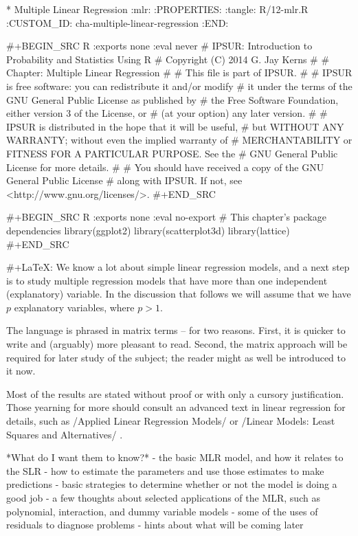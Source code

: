 * Multiple Linear Regression 						:mlr:
:PROPERTIES:
:tangle: R/12-mlr.R
:CUSTOM_ID: cha-multiple-linear-regression
:END:

#+BEGIN_SRC R :exports none :eval never
#    IPSUR: Introduction to Probability and Statistics Using R
#    Copyright (C) 2014  G. Jay Kerns
#
#    Chapter: Multiple Linear Regression
#
#    This file is part of IPSUR.
#
#    IPSUR is free software: you can redistribute it and/or modify
#    it under the terms of the GNU General Public License as published by
#    the Free Software Foundation, either version 3 of the License, or
#    (at your option) any later version.
#
#    IPSUR is distributed in the hope that it will be useful,
#    but WITHOUT ANY WARRANTY; without even the implied warranty of
#    MERCHANTABILITY or FITNESS FOR A PARTICULAR PURPOSE.  See the
#    GNU General Public License for more details.
#
#    You should have received a copy of the GNU General Public License
#    along with IPSUR.  If not, see <http://www.gnu.org/licenses/>.
#+END_SRC

#+BEGIN_SRC R :exports none :eval no-export
# This chapter's package dependencies
library(ggplot2)
library(scatterplot3d)
library(lattice)
#+END_SRC

#+LaTeX: \noindent 
We know a lot about simple linear regression models, and a next step
is to study multiple regression models that have more than one
independent (explanatory) variable. In the discussion that follows we
will assume that we have \(p\) explanatory variables, where \(p > 1\).

The language is phrased in matrix terms -- for two reasons. First, it
is quicker to write and (arguably) more pleasant to read. Second, the
matrix approach will be required for later study of the subject; the
reader might as well be introduced to it now.

Most of the results are stated without proof or with only a cursory
justification. Those yearning for more should consult an advanced text
in linear regression for details, such as /Applied Linear Regression
Models/ \cite{Neter1996} or /Linear Models: Least Squares and
Alternatives/ \cite{Rao1999}.

*What do I want them to know?*
- the basic MLR model, and how it relates to the SLR
- how to estimate the parameters and use those estimates to make
  predictions
- basic strategies to determine whether or not the model is doing a
  good job
- a few thoughts about selected applications of the MLR, such as
  polynomial, interaction, and dummy variable models
- some of the uses of residuals to diagnose problems
- hints about what will be coming later

